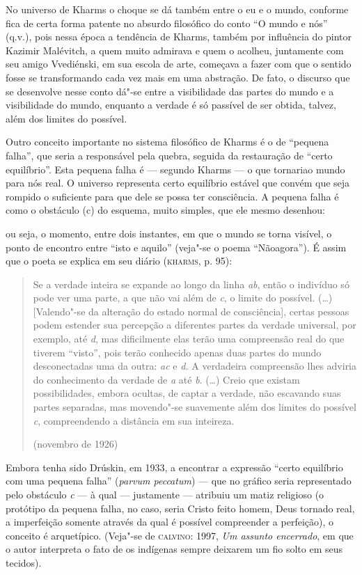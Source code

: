 No universo de Kharms o choque se dá também entre o eu e o mundo,
conforme fica de certa forma patente no absurdo filosófico do conto ``O
mundo e nós'' (q.v.), pois nessa época a tendência de Kharms, também por
influência do pintor Kazimir Malévitch, a quem muito admirava e quem o
acolheu, juntamente com seu amigo Vvediénski, em sua escola de arte,
começava a fazer com que o sentido fosse se transformando cada vez mais
em uma abstração. De fato, o discurso que se desenvolve nesse conto
dá"-se entre a visibilidade das partes do mundo e a visibilidade do
mundo, enquanto a verdade é só passível de ser obtida, talvez, além dos
limites do possível.

Outro conceito importante no sistema filosófico de Kharms é o de
``pequena falha'', que seria a responsável pela quebra, seguida da
restauração de ``certo equilíbrio''. Esta pequena falha é --- segundo
Kharms --- o que tornariao mundo para nós real. O universo representa
certo equilíbrio estável que convém que seja rompido o suficiente para
que dele se possa ter consciência. A pequena falha é como o obstáculo
(c) do esquema, muito simples, que ele mesmo desenhou:


ou seja, o momento, entre dois instantes, em que o mundo se torna
visível, o ponto de encontro entre ``isto e aquilo'' (veja"-se o poema
``Nãoagora''). É assim que o poeta se explica em seu diário
(\textsc{kharms}, p. 95):

\begin{quote}
Se a verdade inteira se expande ao longo da linha \emph{ab}, então o
indivíduo só pode ver uma parte, a que não vai além de \emph{c}, o
limite do possível. (\ldots{}) {[}Valendo"-se da alteração do estado
normal de consciência{]}, certas pessoas podem estender sua percepção a
diferentes partes da verdade universal, por exemplo, até \emph{d}, mas
dificilmente elas terão uma compreensão real do que tiverem ``visto'',
pois terão conhecido apenas duas partes do mundo desconectadas uma da
outra: \emph{ac} e \emph{d.} A verdadeira compreensão lhes adviria do
conhecimento da verdade de \emph{a} até \emph{b}. (\ldots{}) Creio que
existam possibilidades, embora ocultas, de captar a verdade, não
escavando suas partes separadas, mas movendo"-se suavemente além dos
limites do possível \emph{c}, compreendendo a distância em sua
inteireza.

(novembro de 1926)
\end{quote}

Embora tenha sido Drúskin, em 1933, a encontrar a expressão ``certo
equilíbrio com uma pequena falha'' (\emph{parvum peccatum}) --- que no
gráfico seria representado pelo obstáculo \emph{c} --- à qual ---
justamente --- atribuiu um matiz religioso (o protótipo da pequena falha,
no caso, seria Cristo feito homem, Deus tornado real, a imperfeição
somente através da qual é possível compreender a perfeição), o conceito
é arquetípico. (Veja"-se de \textsc{calvino}: 1997, \emph{Um assunto
encerrado}, em que o autor interpreta o fato de os indígenas sempre
deixarem um fio solto em seus tecidos).

